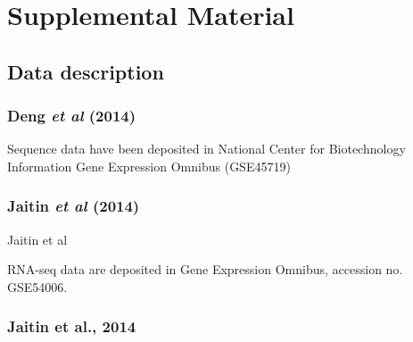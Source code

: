 \section{Supplemental Material}


\subsection{Data description}

\subsubsection{Deng \textit{et al} (2014) \cite{Deng2014}}

Sequence data have been deposited in
 National Center for Biotechnology Information Gene
 Expression Omnibus (GSE45719) 


\subsubsection{Jaitin \textit{et al} (2014) \cite{Jaitin2014}}


Jaitin et al 

RNA-seq data are deposited in
 Gene Expression Omnibus, accession no. GSE54006.


\subsubsection{Jaitin et al., 2014}



















 









